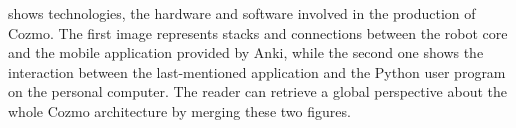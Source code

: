 shows technologies, the hardware and software involved in the production of Cozmo. The first image represents stacks and connections between the robot core and the mobile application provided by Anki, while the second one shows the interaction between the last-mentioned application and the Python user program on the personal computer. The reader can retrieve a global perspective about the whole Cozmo architecture by merging these two figures.

\begin{figure}
	\scalebox{0.9}{
		\centering
		\begin{tikzpicture}[x=0.75pt,y=0.75pt,yscale=-1,xscale=1]
			

\end{tikzpicture}}
\end{figure}
